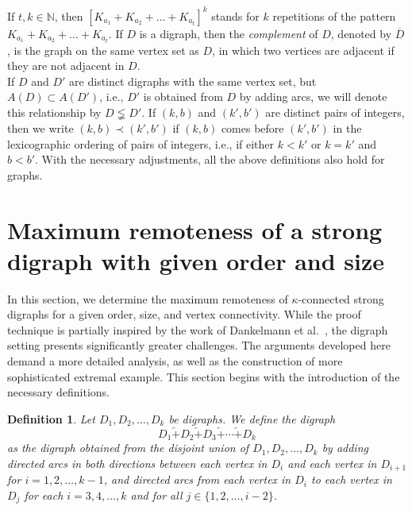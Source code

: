 \documentclass[a4paper,11pt]{article}
\newtheorem{definition}{Definition}[section]
\begin{document}
If $t, k\in \mathbb{N}$, then $[K_{a_1} + K_{a_2}+\ldots+K_{a_t}]^k$ 
stands for $k$ repetitions of the pattern 
$K_{a_1} + K_{a_2}+\ldots+K_{a_t}$. If $D$ is a digraph, then the {\em complement} of $D$, denoted by $\overline{D}$, is the graph on the same vertex set as $D$, in which two vertices are adjacent if
they are not adjacent in $D$. \\

If $D$ and $D'$ are distinct digraphs with the same vertex set, but $A(D) \subset A(D')$, i.e., $D'$ is obtained from $D$ by adding arcs, we will denote this relationship by $D \lneqq D'$. If $(k,b)$ and $(k',b')$ are distinct pairs of integers, then we write $(k,b) \prec (k',b')$ if $(k,b)$ comes before $(k',b')$ in the lexicographic ordering of pairs of integers, i.e., if
either $k<k'$ or $k=k'$ and $b< b'$. With the necessary adjustments, all the above definitions also hold for graphs.






\section{Maximum remoteness of a strong digraph with given order and size}\label{strong digraph}
In this section, we determine the maximum remoteness of $\kappa$-connected strong digraphs for a given order, size, and vertex connectivity. While the proof technique is partially inspired by the work of Dankelmann et al.~\cite{DanMafMal2025}, the digraph setting presents significantly greater challenges. The arguments developed here demand a more detailed analysis, as well as the construction of more sophisticated extremal example. This section begins with the introduction of the necessary definitions.


\begin{definition}
Let \( D_1, D_2, \ldots, D_k \) be digraphs. We define the digraph $$D_1 \overleftarrow{+} D_2 \overleftarrow{+} D_3 \overleftarrow{+} \cdots \overleftarrow{+} D_k$$ as the digraph obtained from the disjoint union of \( D_1, D_2, \ldots, D_k \) by adding directed arcs in both directions between each vertex in $D_i$ and each vertex in $D_{i+1}$ for $i=1,2,\ldots,k-1$, and directed arcs from each vertex in $D_i$ to each vertex in $D_j$ for each \( i = 3, 4, \ldots, k \) and for all $j \in \{1,2,\ldots,i-2\}$.
\end{definition}
\end{document}
